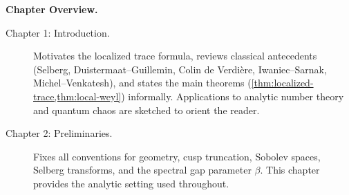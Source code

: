 \medskip

\noindent\textbf{Chapter Overview.}
\begin{description}
  \item[Chapter 1: Introduction.] 
  Motivates the localized trace formula,
  reviews classical antecedents (Selberg, Duistermaat–Guillemin,
  Colin de Verdière, Iwaniec–Sarnak, Michel–Venkatesh),
  and states the main theorems
  (\cref{thm:localized-trace,thm:local-weyl}) informally.
  Applications to analytic number theory and quantum chaos
  are sketched to orient the reader.

  \item[Chapter 2: Preliminaries.] 
  Fixes all conventions for geometry, cusp truncation,
  Sobolev spaces, Selberg transforms, and the spectral gap parameter $\beta$.
  This chapter provides the analytic setting used throughout.
\end{description}

